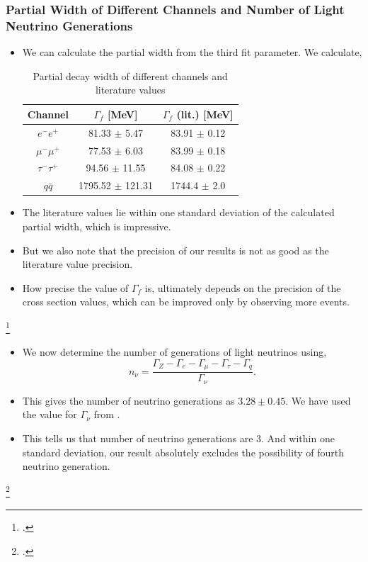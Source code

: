 \documentclass[10pt]{beamer}
\begin{document}
\begin{frame}
\frametitle{Partial Width of Different Channels and Number of Light Neutrino Generations}
\begin{itemize}
  \item We can calculate the partial width from the third fit parameter. We calculate,
  \begin{table}[h!]
    \centering
    \begin{tabular}{c|cc}
    \hline
    Channel        & $\Gamma_f$ {[}MeV{]} & $\Gamma_f$ (lit.) {[}MeV{]} \\ \hline
    $e^-e^+$       & 81.33 $\pm$ 5.47     & 83.91 $\pm$ 0.12              \\
    $\mu^-\mu^+$   & 77.53 $\pm$ 6.03     & 83.99 $\pm$ 0.18              \\
    $\tau^-\tau^+$ & 94.56 $\pm$ 11.55    & 84.08 $\pm$ 0.22              \\
    $q\bar{q}$     & 1795.52 $\pm$ 121.31 & 1744.4 $\pm$ 2.0              \\ \hline
    \end{tabular}
    \caption{Partial decay width of different channels and literature values}
    \label{table:decaywidth}
  \end{table}
  \item The literature values \footnotemark{} lie within one standard deviation of the calculated partial width, which is impressive.
  \item But we also note that the precision of our results is not as good as the literature value precision.
  \item How precise the value of $\Gamma_f$ is, ultimately depends on the precision of the cross section values, which can be improved only by observing more events.
\end{itemize}
\footcitetext{pdg2}
\end{frame}

\begin{frame}
\begin{itemize}
  \item We now determine the number of generations of light neutrinos using,
  \begin{equation}
    n_{\nu} = \frac{\Gamma_Z - \Gamma_e - \Gamma_{\mu} - \Gamma_{\tau} - \Gamma_q}{\Gamma_{\nu}}.
  \end{equation}
  \item This gives the number of neutrino generations as $3.28 \pm 0.45$. We have used the value for $\Gamma_{\nu}$ from \footnotemark{}.
  \item This tells us that number of neutrino generations are $3$. And within one standard deviation, our result absolutely excludes the possibility of fourth neutrino generation.
\end{itemize}
\footcitetext{UB}
\end{frame}
\end{document}
